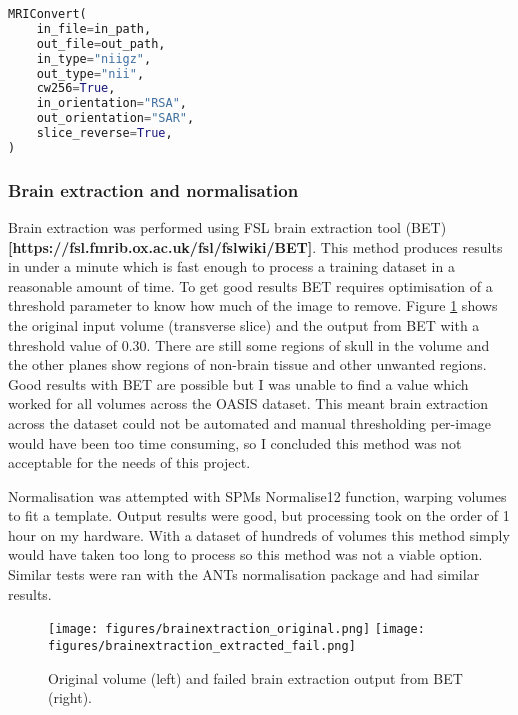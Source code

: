 \documentclass[
    author={Kai Hulme},
    supervisor={Dr Jon Bird},
    degree={BSc},
    title={Generative Adversarial Networks as an Augmentation Technique},
    subtitle={for Alzheimer's Disease Detection in MRI Volumes},
    type={Research},
    year={2021} 
]{dissertation}
\begin{document}
\begin{lstlisting}[float={t},language=Python, caption={FreeSurfer MRIConvert arguments for decompressing NIfTI volume and re-sampling to 1x1x1mm voxels, reshaping to 256x256x256 and reorienting axis orientation to align with target template.}, label={mri_convert}]
MRIConvert(
    in_file=in_path,
    out_file=out_path,
    in_type="niigz",
    out_type="nii",
    cw256=True,
    in_orientation="RSA",
    out_orientation="SAR",
    slice_reverse=True,
)
\end{lstlisting}

\subsubsection{Brain extraction and normalisation}

Brain extraction was performed using FSL brain extraction tool (BET) \textbf{[https://fsl.fmrib.ox.ac.uk/fsl/fslwiki/BET]}. This method produces results in under a minute which is fast enough to process a training dataset in a reasonable amount of time. To get good results BET requires optimisation of a threshold parameter to know how much of the image to remove. Figure \ref{mri_bet} shows the original input volume (transverse slice) and the output from BET with a threshold value of $0.30$. There are still some regions of skull in the volume and the other planes show regions of non-brain tissue and other unwanted regions. Good results with BET are possible but I was unable to find a value which worked for all volumes across the OASIS dataset. This meant brain extraction across the dataset could not be automated and manual thresholding per-image would have been too time consuming, so I concluded this method was not acceptable for the needs of this project.

Normalisation was attempted with SPMs Normalise12 function, warping volumes to fit a template. Output results were good, but processing took on the order of 1 hour on my hardware. With a dataset of hundreds of volumes this method simply would have taken too long to process so this method was not a viable option. Similar tests were ran with the ANTs normalisation package and had similar results.

\begin{figure}[t]
    \centering
    \texttt{[image: figures/brainextraction\_original.png]}
    \texttt{[image: figures/brainextraction\_extracted\_fail.png]}
    \caption{Original volume (left) and failed brain extraction output from BET (right).}
    \label{mri_bet}
\end{figure}
\end{document}
